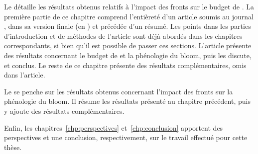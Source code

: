 Le  détaille les résultats obtenus relatifs à l'impact des fronts sur le budget de .
La première partie de ce chapitre comprend l'entièreté d'un article soumis au journal , dans sa version finale (en ) et précédée d'un résumé.
Les points dans les parties d'introduction et de méthodes de l'article sont déjà abordés dans les chapitres correspondants, si bien qu'il est possible de passer ces sections.
L'article présente des résultats concernant le budget de  et la phénologie du bloom, puis les discute, et conclus.
Le reste de ce chapitre présente des résultats complémentaires, omis dans l'article.

Le  se penche sur les résultats obtenus concernant l'impact des fronts sur la phénologie du bloom.
Il résume les résultats présenté au chapitre précédent, puis y ajoute des résultats complémentaires.

Enfin, les chapitres~\ref{chp:perspectives} et~\ref{chp:conclusion} apportent des perspectives et une conclusion, respectivement, sur le travail effectué pour cette thèse.
